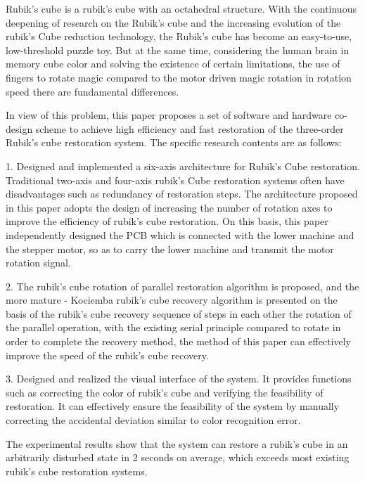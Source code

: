 \begin{abstracte}
	
	Rubik’s cube is a rubik’s cube with an octahedral structure. With the continuous deepening of research on the Rubik’s cube and the increasing evolution of the rubik’s
	Cube reduction technology, the Rubik’s cube has become an easy-to-use, low-threshold puzzle toy. But at the same time, considering the human brain in memory cube color and
	solving the existence of certain limitations, the use of fingers to rotate magic compared to the motor driven magic rotation in rotation speed there are fundamental differences.
	
	In view of this problem, this paper proposes a set of software and hardware co-design scheme to achieve high efficiency and fast restoration of the three-order Rubik’s cube
	restoration system. The specific research contents are as follows:
	
	1. Designed and implemented a six-axis architecture for Rubik’s Cube restoration. Traditional two-axis and four-axis rubik’s Cube restoration systems often have disadvantages such as redundancy of restoration steps. The architecture proposed in this paper adopts the design of increasing the number of rotation axes to improve the efficiency of rubik’s cube restoration. On this basis, this paper independently designed the PCB which is connected with the lower machine and the stepper motor, so as to carry the lower machine and transmit the motor rotation signal.
	
	2. The rubik’s cube rotation of parallel restoration algorithm is proposed, and the more mature - Kociemba rubik’s cube recovery algorithm is presented on the basis of the rubik’s cube recovery sequence of steps in each other the rotation of the parallel operation, with the existing serial principle compared to rotate in order to complete the recovery method, the method of this paper can effectively improve the speed of the rubik’s cube recovery.
	
	3. Designed and realized the visual interface of the system. It provides functions such as correcting the color of rubik’s cube and verifying the feasibility of restoration. It can effectively ensure the feasibility of the system by manually correcting the accidental deviation similar to color recognition error.
	
	The experimental results show that the system can restore a rubik’s cube in an arbitrarily disturbed state in 2 seconds on average, which exceeds most existing rubik’s cube restoration systems.
	
\end{abstracte}
